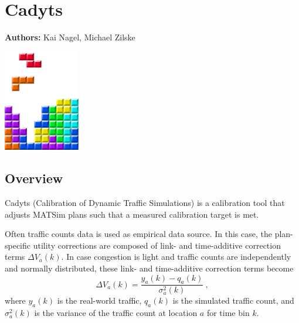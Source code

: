 \chapter{Cadyts}
\label{ch:cadyts}

\hfill \textbf{Authors:} Kai Nagel, Michael Zilske

\begin{center} \includegraphics[width=0.25\textwidth, angle=0]{figures/MATSimBook.png} \end{center}


\section{Overview}

Cadyts (Calibration of Dynamic Traffic Simulations) is a calibration tool that adjusts MATSim plans such that a measured calibration target is met. 

Often traffic counts data is used as empirical data source.  In this case, the plan-specific utility corrections are composed of link- and time-additive correction terms $\Delta V_a(k)$.  In case congestion is light and traffic counts are independently and normally distributed, these link- and time-additive correction terms become \cite[p.487]{FloetteroedChenEtAl2011BehavioralCalibAndAnaNETS}
\begin{equation}
\Delta V_a(k) = \frac{y_a(k) - q_a(k)} {\sigma_a^2(k)} \ ,
\label{eq:cadyts:correction}
\end{equation}
%
where $y_a(k)$ is the real-world traffic, $q_a(k)$ is the simulated traffic count, and $\sigma^2_a(k)$ is the variance of the traffic count at location $a$ for time bin $k$.
%

